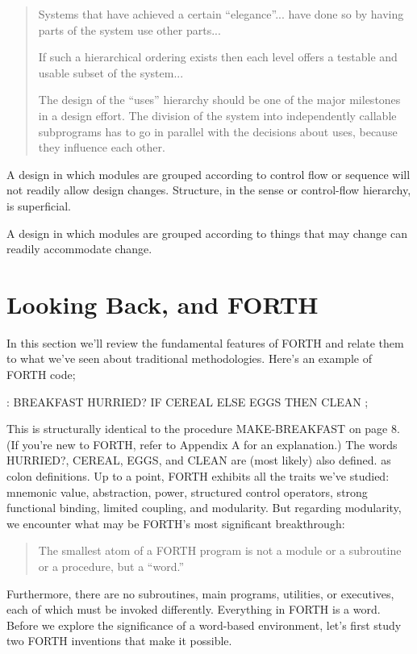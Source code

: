 \begin{quote}
Systems that have achieved a certain {}``elegance''... have done
so by having parts of the system use other parts...

If such a hierarchical ordering exists then each level offers a testable
and usable subset of the system...

The design of the {}``uses'' hierarchy should be one of the major
milestones in a design effort. The division of the system into independently
callable subprograms has to go in parallel with the decisions about
uses, because they influence each other.
\end{quote}
A design in which modules are grouped according to control flow or
sequence will not readily allow design changes. Structure, in the
sense or control-flow hierarchy, is superficial.

A design in which modules are grouped according to things that may
change can readily accommodate change.


\section{Looking Back, and FORTH}
In this section we'll review the fundamental features of FORTH and
relate them to what we've seen about traditional methodologies. Here's
an example of FORTH code;

\begin{Code}
: BREAKFAST
   HURRIED?  IF  CEREAL  ELSE  EGGS  THEN CLEAN ;
\end{Code}
This is structurally identical to the procedure MAKE-BREAKFAST on
page 8. (If you're new to FORTH, refer to Appendix A for an explanation.)
The words HURRIED?, CEREAL, EGGS, and CLEAN are (most likely) also
defined. as colon definitions. Up to a point, FORTH exhibits all the
traits we've studied: mnemonic value, abstraction, power, structured
control operators, strong functional binding, limited coupling, and
modularity. But regarding modularity, we encounter what may be FORTH's
most significant breakthrough:

\begin{quote}
The smallest atom of a FORTH program is not a module or a subroutine
or a procedure, but a {}``word.''
\end{quote}
Furthermore, there are no subroutines, main programs, utilities, or
executives, each of which must be invoked differently. Everything
in FORTH is a word. Before we explore the significance of a word-based
environment, let's first study two FORTH inventions that make it possible.



